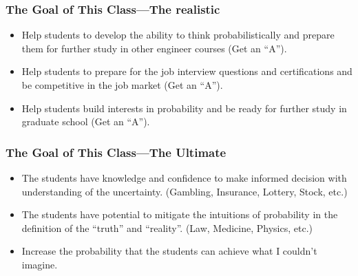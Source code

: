 \documentclass[11pt]{RU}
\theoremstyle{definition}
\theoremstyle{remark}
\begin{document}
\begin{frame}
\frametitle{The Goal of This Class---The realistic}
\begin{itemize}
    \item Help students to develop the ability to think probabilistically and prepare them for further study in other engineer courses (\aka Get an ``A'').
    \item Help students to prepare for the job interview questions and certifications and be competitive in the job market (\aka Get an ``A'').
    \item Help students build interests in probability and be ready for further study in graduate school (\aka Get an ``A'').
\end{itemize}
\end{frame}

\begin{frame}
\frametitle{The Goal of This Class---The Ultimate}
\begin{itemize}
    \item The students have knowledge and confidence to make informed decision with understanding of the uncertainty. (\Eg Gambling, Insurance, Lottery, Stock,  etc.)
    \item The students have potential to mitigate the intuitions of probability in the definition of the ``truth'' and ``reality''. (\Eg Law, Medicine, Physics, etc.)
    \item Increase the probability that the students can achieve what I couldn't imagine.
\end{itemize}
\end{frame}
\end{document}
